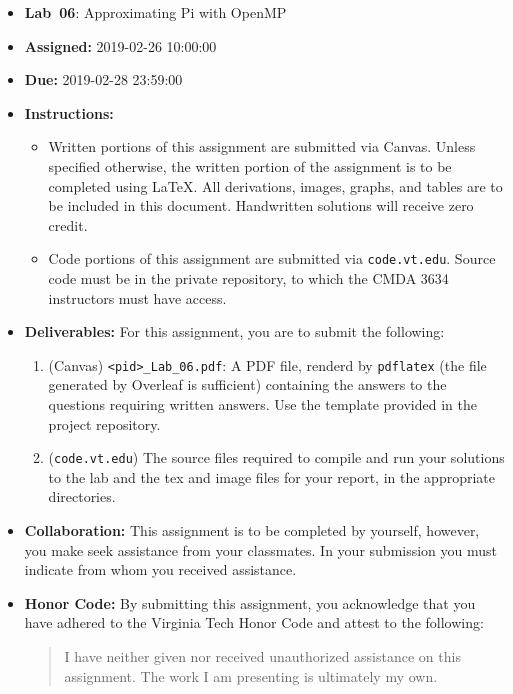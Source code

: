 \documentclass[letter]{article}
\title{\coursenumber \coursecrn}
\date{}
\newcommand{\assignmenttype}{Lab}
\newcommand{\assignmentnumber}{06}
\newcommand{\assignmentreleasedate}{2019-02-26 10:00:00}
\newcommand{\assignmentduedate}{2019-02-28 23:59:00}
\newcommand{\assignmenttitle}{Approximating Pi with OpenMP}
\begin{document}
\thispagestyle{fancy}%

\begin{itemize}[leftmargin=*]
    \item[] \textbf{\assignmenttype~\assignmentnumber}: \assignmenttitle
    \item[] \textbf{Assigned: } \assignmentreleasedate
    \item[] \textbf{Due: } \assignmentduedate
    \item[] \textbf{Instructions: }
        \begin{itemize}
            \item Written portions of this assignment are submitted via Canvas.  Unless specified otherwise, the written portion of the assignment is to be completed using LaTeX.  All derivations, images, graphs, and tables are to be included in this document.  Handwritten solutions will receive zero credit.
            \item Code portions of this assignment are submitted via \texttt{code.vt.edu}.  Source code must be in the private repository, to which the CMDA 3634 instructors must have access.
        \end{itemize}
    \item[] \textbf{Deliverables:} For this assignment, you are to submit the following:
        \begin{enumerate}
            \item (Canvas) \texttt{<pid>\_\assignmenttype\_06.pdf}: A PDF file, renderd by \texttt{pdflatex} (the file generated by Overleaf is sufficient) containing the answers to the questions requiring written answers.  Use the template provided in the project repository. 
            \item (\texttt{code.vt.edu}) The source files required to compile and run your solutions to the lab and the tex and image files for your report, in the appropriate directories.
        \end{enumerate}
    \item[] \textbf{Collaboration: } This assignment is to be completed by yourself, however, you make seek assistance from your classmates.  In your submission you must indicate from whom you received assistance.
    \item[] \textbf{Honor Code: } By submitting this assignment, you acknowledge that you have adhered to the Virginia Tech Honor Code and attest to the following:
        \begin{quote}
           I have neither given nor received unauthorized assistance on this assignment.  The work I am presenting is ultimately my own.
        \end{quote}
\end{itemize}
\end{document}

